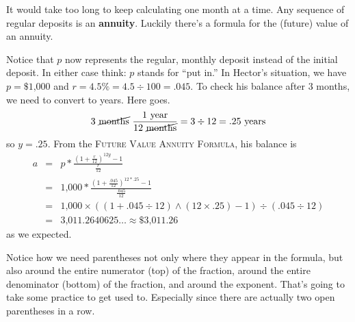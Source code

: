 It would take too long to keep calculating one month at a time.  Any sequence of regular deposits is an \textbf{annuity}.  Luckily there's a formula for the (future) value of an annuity. 

 \bigskip
\bigskip

Notice that $p$ now represents the regular, monthly deposit instead of the initial deposit.  In either case think:  $p$ stands for ``put in.''  In Hector's situation, we have $p=\$\text{1,000}$ and $r=4.5\% =4.5 \div 100 =.045$.  To check his balance after 3 months, we need to convert to years.  Here goes. 
 $$3 \text{ \cancel{months} }  \frac{1 \text{ year}}{12 \text{ \cancel{months}}} =3 \div 12= .25 \text{ years}$$
 so $y = .25$.   From the  \textsc{Future Value Annuity Formula}, his balance is
\begin{eqnarray*}
a & = &  p \ast \frac{\left( 1 + \frac{r}{12}\right) ^{12y}-1}{\frac{r}{12}}\\
& = &    \text{1,000} \ast \frac{\left( 1 + \frac{.045}{12}\right) ^{12\ast.25}-1}{\frac{.045}{12}}\\
& =  &  \text{1,000} \times (( 1 + .045 \div 12) \wedge (12 \times .25)-1) \div (.045 \div 12)\\
& =  & \text{3,011.2640625}\ldots  \approx \$\text{3,011.26}
\end{eqnarray*}
as we expected.

Notice how we need parentheses not only where they appear in the formula, but also around the entire numerator (top) of the fraction, around the entire denominator (bottom) of the fraction, and around the exponent.  That's going to take some practice to get used to.  Especially since there are actually two open parentheses in a row. 

